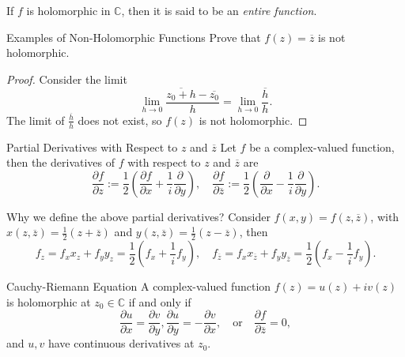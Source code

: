 \begin{note}
  If $f$ is holomorphic in $\mathbb{C}$, then it is said to be an \emph{entire function}.
\end{note}

\begin{example}{Examples of Non-Holomorphic Functions}{}
  Prove that $f(z) = \overline{z}$ is not holomorphic.
\end{example}

\begin{proof}
  Consider the limit
  \begin{equation}
    \lim \limits _{h \rightarrow 0} \frac{ \overline{z_0 + h} - \overline{z_0}}{h}
    = \lim \limits _{h \rightarrow 0}\frac{\overline{h}}{h}.
  \end{equation}
  The limit of $\frac{\overline{h}}{h}$ does not exist, so $f(z)$ is not holomorphic.
\end{proof}

\begin{definition}{Partial Derivatives with Respect to $z$ and $\overline{z}$}{}
  Let $f$ be a complex-valued function,
  then the derivatives of $f$ with respect to $z$ and $\overline{z}$ are
  \begin{equation}
    \frac{\partial f}{\partial z} := \frac{1}{2} \left( \frac{\partial f}{\partial x} + \frac{1}{i} \frac{\partial }{\partial y} \right), \quad
    \frac{\partial f}{\partial \overline{z}} := \frac{1}{2} \left( \frac{\partial }{\partial x} - \frac{1}{i} \frac{\partial}{\partial y} \right).
  \end{equation}
\end{definition}

\begin{note}
  Why we define the above partial derivatives?
  Consider $f(x,y) = f(z, \overline{z})$,
  with $x(z, \overline{z}) = \frac{1}{2}(z + \overline{z})$ and $y(z,
  \overline{z}) = \frac{1}{2}(z - \overline{z})$, then
  \begin{equation}
    f_z = f_x x_z + f_y y_z = \frac{1}{2}(f_x + \frac{1}{i}f_y), \quad
    f_{\overline{z}} = f_x x_{\overline{z}} + f_y y_{\overline{z}} = \frac{1}{2}(f_x - \frac{1}{i}f_y).
  \end{equation}
\end{note}

\begin{theorem}{Cauchy-Riemann Equation}{}
  A complex-valued function $f(z) = u(z) + iv(z)$ is holomorphic at $z_0 \in \mathbb{C}$ if and
  only if
  \begin{equation}
    \frac{\partial u}{\partial x} = \frac{\partial v}{\partial y},
    \frac{\partial u}{\partial y} = - \frac{\partial v}{\partial x}, \quad
    \text{or} \quad
    \frac{\partial f}{\partial \overline{z}} = 0,
  \end{equation}
  and $u, v$ have continuous derivatives at $z_0$.
\end{theorem}

